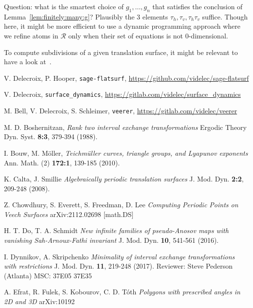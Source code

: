 \documentclass[a4paper,12pt]{article}
\begin{document}
Question: what is the smartest choice of $g_1, \ldots, g_n$ that satisfies
the conclusion of Lemma~\ref{lem:finitely:many:g}? Plausibly the 3 elements
$\tau_h, \tau_v, \tau_h \tau_v$ suffice. Though here, it might be
more efficient to use a dynamic programming approach where we refine
atoms in $\mathcal{R}$ only when their set of equations is not $0$-dimensional.

\smallskip

To compute subdivisions of a given translation surface, it might be relevant to
have a look at~\cite{Kirkpatrick83}.

\begin{thebibliography}{sage-flatsurf}

V. Delecroix, P. Hooper,
\texttt{sage-flatsurf},
\url{https://github.com/videlec/sage-flatsurf}

V. Delecroix,
\texttt{surface\_dynamics},
\url{https://gitlab.com/videlec/surface_dynamics}

M. Bell, V. Delecroix, S. Schleimer,
\texttt{veerer},
\url{https://gitlab.com/videlec/veerer}

M. D. Boshernitzan,
\textit{Rank two interval exchange transformations}
Ergodic Theory Dyn. Syst. \textbf{8:3}, 379-394 (1988).

I. Bouw, M. Möller,
\textit{Teichmüller curves, triangle groups, and Lyapunov exponents}
Ann. Math. (2) \textbf{172:1}, 139-185 (2010).

K. Calta, J. Smillie
\textit{Algebraically periodic translation surfaces}
J. Mod. Dyn. \textbf{2:2}, 209-248 (2008).

Z. Chowdhury, S. Everett, S. Freedman, D. Lee
\textit{Computing Periodic Points on Veech Surfaces}
arXiv:2112.02698 [math.DS]

H. T. Do, T. A. Schmidt
\textit{New infinite families of pseudo-Anosov maps with vanishing Sah-Arnoux-Fathi invariant}
J. Mod. Dyn. \textbf{10}, 541-561 (2016).

I. Dynnikov, A. Skripchenko
\textit{Minimality of interval exchange transformations with restrictions}
J. Mod. Dyn. \textbf{11}, 219-248 (2017).
Reviewer: Steve Pederson (Atlanta)
MSC:  37E05 37E35

A. Efrat, R. Fulek, S. Kobourov, C. D. T\'oth
\textit{Polygons with prescribed angles in 2D and 3D}
arXiv:10192


\end{thebibliography}
\end{document}
